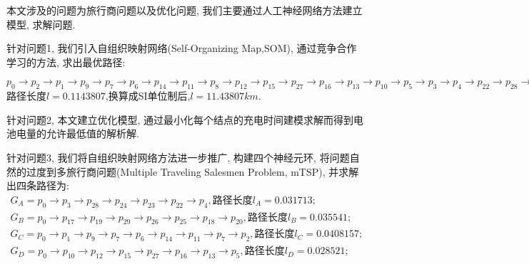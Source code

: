 \newpage


\centerline{\fangsong\bf{}}


\vskip 1cm


\vskip 10bp

{
	\kaishu	
	本文涉及的问题为旅行商问题以及优化问题, 我们主要通过人工神经网络方法建立模型, 求解问题.
	
	针对问题1, 我们引入自组织映射网络(Self-Organizing Map,SOM), 通过竞争合作学习的方法, 求出最优路径:

	$p_{0}\rightarrow p_2\rightarrow p_1\rightarrow p_9\rightarrow p_7\rightarrow p_6\rightarrow p_{14}\rightarrow p_{11}\rightarrow p_{8}\rightarrow  p_{12}\rightarrow  p_{15}\rightarrow  p_{27}\rightarrow  p_{16}\rightarrow  p_{13}\rightarrow  p_{10}\rightarrow p_{5}\rightarrow p_{3}\rightarrow p_{4}\rightarrow p_{22}\rightarrow  p_{28}\rightarrow p_{24}\rightarrow p_{23}\rightarrow p_{21}\rightarrow p_{29}\rightarrow p_{26}\rightarrow p_{25}\rightarrow p_{18}\rightarrow p_{19}\rightarrow p_{20}\rightarrow p_{17}$
	路径长度$l= 0.1143807$,换算成SI单位制后,$l=11.43807 km$.
	
	针对问题2, 本文建立优化模型, 通过最小化每个结点的充电时间建模求解而得到电池电量的允许最低值的解析解.
	
	针对问题3, 我们将自组织映射网络方法进一步推广, 构建四个神经元环, 将问题自然的过度到多旅行商问题(Multiple Traveling Salesmen Problem, mTSP), 并求解出四条路径为:
	\begin{eqnarray}
		\nonumber
	G_A = p_0 \rightarrow p_3 \rightarrow p_{28} \rightarrow p_{24} \rightarrow p_{23} \rightarrow p_{22} \rightarrow p_{4}, \text{路径长度} l_A = 0.031713;\\ 
	\nonumber
	G_B = p_0  \rightarrow p_{17} \rightarrow p_{19} \rightarrow p_{29} \rightarrow p_{26} \rightarrow p_{25} \rightarrow p_{18} \rightarrow p_{20}, \text{路径长度}l_B = 0.035541;\\
	\nonumber
	G_C = p_{0} \rightarrow p_{1} \rightarrow  p_{9} \rightarrow  p_{7} \rightarrow  p_{6} \rightarrow  p_{14} \rightarrow  p_{11} \rightarrow   p_{7} \rightarrow  p_{2} , \text{路径长度} l_C = 0.0408157;\\
	\nonumber
	G_D = p_{0} \rightarrow  p_{10} \rightarrow  p_{12} \rightarrow  p_{15} \rightarrow  p_{27} \rightarrow  p_{16} \rightarrow  p_{13} \rightarrow  p_{5} , \text{路径长度} l_D = 0.028521; 
	\end{eqnarray}

}
